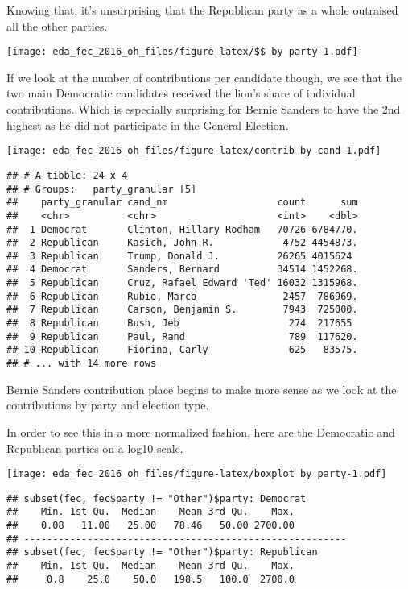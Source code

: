 \documentclass[]{article}
\begin{document}
Knowing that, it's unsurprising that the Republican party as a whole
outraised all the other parties.

\texttt{[image: eda\_fec\_2016\_oh\_files/figure-latex/\$\$ by party-1.pdf]}

If we look at the number of contributions per candidate though, we see
that the two main Democratic candidates received the lion's share of
individual contributions. Which is especially surprising for Bernie
Sanders to have the 2nd highest as he did not participate in the General
Election.

\texttt{[image: eda\_fec\_2016\_oh\_files/figure-latex/contrib by cand-1.pdf]}

\begin{verbatim}
## # A tibble: 24 x 4
## # Groups:   party_granular [5]
##    party_granular cand_nm                   count      sum
##    <chr>          <chr>                     <int>    <dbl>
##  1 Democrat       Clinton, Hillary Rodham   70726 6784770.
##  2 Republican     Kasich, John R.            4752 4454873.
##  3 Republican     Trump, Donald J.          26265 4015624 
##  4 Democrat       Sanders, Bernard          34514 1452268.
##  5 Republican     Cruz, Rafael Edward 'Ted' 16032 1315968.
##  6 Republican     Rubio, Marco               2457  786969.
##  7 Republican     Carson, Benjamin S.        7943  725000.
##  8 Republican     Bush, Jeb                   274  217655 
##  9 Republican     Paul, Rand                  789  117620.
## 10 Republican     Fiorina, Carly              625   83575.
## # ... with 14 more rows
\end{verbatim}

Bernie Sanders contribution place begins to make more sense as we look
at the contributions by party and election type.

In order to see this in a more normalized fashion, here are the
Democratic and Republican parties on a log10 scale.

\texttt{[image: eda\_fec\_2016\_oh\_files/figure-latex/boxplot by party-1.pdf]}

\begin{verbatim}
## subset(fec, fec$party != "Other")$party: Democrat
##    Min. 1st Qu.  Median    Mean 3rd Qu.    Max. 
##    0.08   11.00   25.00   78.46   50.00 2700.00 
## -------------------------------------------------------- 
## subset(fec, fec$party != "Other")$party: Republican
##    Min. 1st Qu.  Median    Mean 3rd Qu.    Max. 
##     0.8    25.0    50.0   198.5   100.0  2700.0
\end{verbatim}
\end{document}
